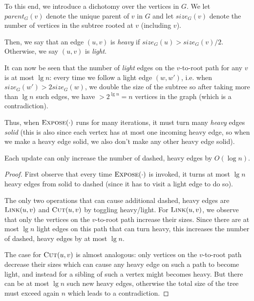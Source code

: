 To this end, we introduce a dichotomy over the vertices in $G$. We let $parent_G(v)$ denote the unique parent of $v$ in $G$ and let $size_G(v)$ denote the number of vertices in the subtree rooted at $v$ (including $v$). 

\begin{definition}
Then, we say that an edge $(u,v)$ is \emph{heavy} if $size_G(u) > size_G(v)/2$. Otherwise, we say $(u,v)$ is \emph{light}. 
\end{definition}

It can now be seen that the number of \emph{light} edges on the $v$-to-root path for any $v$ is at most $\lg n$: every time we follow a light edge $(w,w')$, i.e. when $size_G(w') > 2 size_G(w)$, we double the size of the subtree so after taking more than $\lg n$ such edges, we have $> 2^{\lg n} = n$ vertices in the graph (which is a contradiction).

Thus, when $\textsc{Expose}(\cdot)$ runs for many iterations, it must turn many \emph{heavy} edges \emph{solid} (this is also since each vertex has at most one incoming heavy edge, so when we make a heavy edge solid, we also don't make any other heavy edge solid). 

\begin{claim}
Each update can only increase the number of dashed, heavy edges by $O(\log n)$. 
\end{claim}
\begin{proof}
First observe that every time $\textsc{Expose}(\cdot)$ is invoked, it turns at most $\lg n$ heavy edges from solid to dashed (since it has to visit a light edge to do so).

The only two operations that can cause additional dashed, heavy edges are $\textsc{Link}(u,v)$ and $\textsc{Cut}(u,v)$ by toggling heavy/light. For $\textsc{Link}(u,v)$, we observe that only the vertices on the $v$-to-root path increase their sizes. Since there are at most $\lg n$ light edges on this path that can turn heavy, this increases the number of dashed, heavy edges by at most $\lg n$. 

The case for $\textsc{Cut}(u,v)$ is almost analogous: only vertices on the $v$-to-root path decrease their sizes which can cause any heavy edge on such a path to become light, and instead for a sibling of such a vertex might becomes heavy. But there can be at most $\lg n$ such new heavy edges, otherwise the total size of the tree must exceed again $n$ which leads to a contradiction.
\end{proof}

